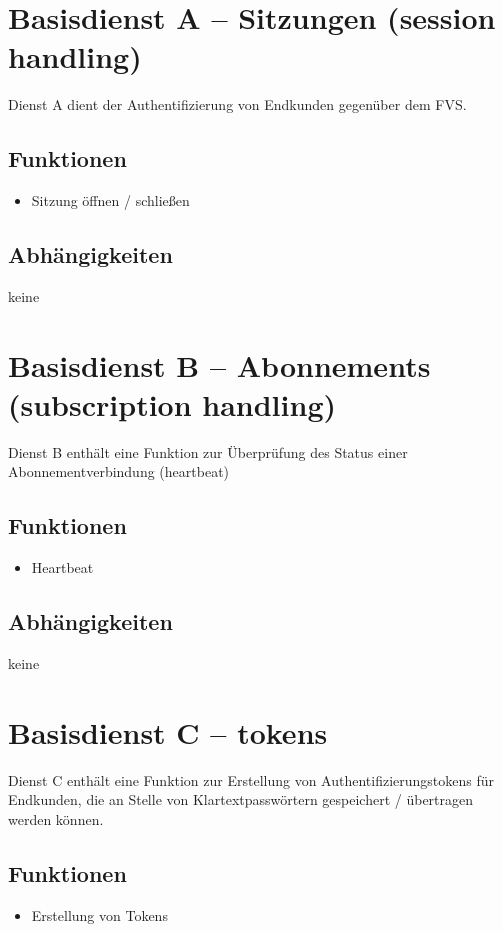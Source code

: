 \section{Basisdienst A -- Sitzungen (session handling)}
\label{sec:Hierachiemodell:BasisdientA}
Dienst A dient der Authentifizierung von Endkunden gegenüber dem FVS.

\subsection*{Funktionen}
\begin{itemize}
\item Sitzung öffnen / schließen
\end{itemize}

\subsection*{Abhängigkeiten}
keine

\section{Basisdienst B -- Abonnements (subscription handling)}
\label{sec:Hierachiemodell:BasisdientB}
Dienst B enthält eine Funktion zur Überprüfung des Status einer Abonnementverbindung (heartbeat)

\subsection*{Funktionen}
\begin{itemize}
\item Heartbeat
\end{itemize}

\subsection*{Abhängigkeiten}
keine

\section{Basisdienst C -- tokens}
\label{sec:Hierachiemodell:BasisdientC}
Dienst C enthält eine Funktion zur Erstellung von Authentifizierungstokens für Endkunden, die an Stelle von Klartextpasswörtern gespeichert / übertragen werden können.

\subsection*{Funktionen}
\begin{itemize}
\item Erstellung von Tokens
\end{itemize}

